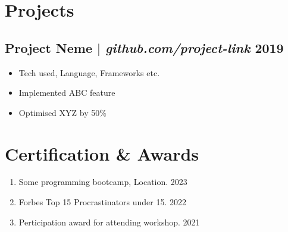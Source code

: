 \documentclass[11pt]{article} %
\begin{document}
\section{Projects}
\subsection{Project Neme $|$ \normalfont\textit{github.com/project-link} \hfill 2019}
\begin{itemize}
	\item Tech used, Language, Frameworks etc.
	\item Implemented ABC feature
	\item Optimised XYZ by 50\%
\end{itemize}

\section{Certification \& Awards}
\begin{enumerate}[label=\null, left=0pt..0pt, itemsep=0pt]
	\item Some programming bootcamp, Location. \hfill 2023
	\item Forbes Top 15 Procrastinators under 15. \hfill 2022
	\item Perticipation award for attending workshop. \hfill 2021
\end{enumerate}
\end{document}
